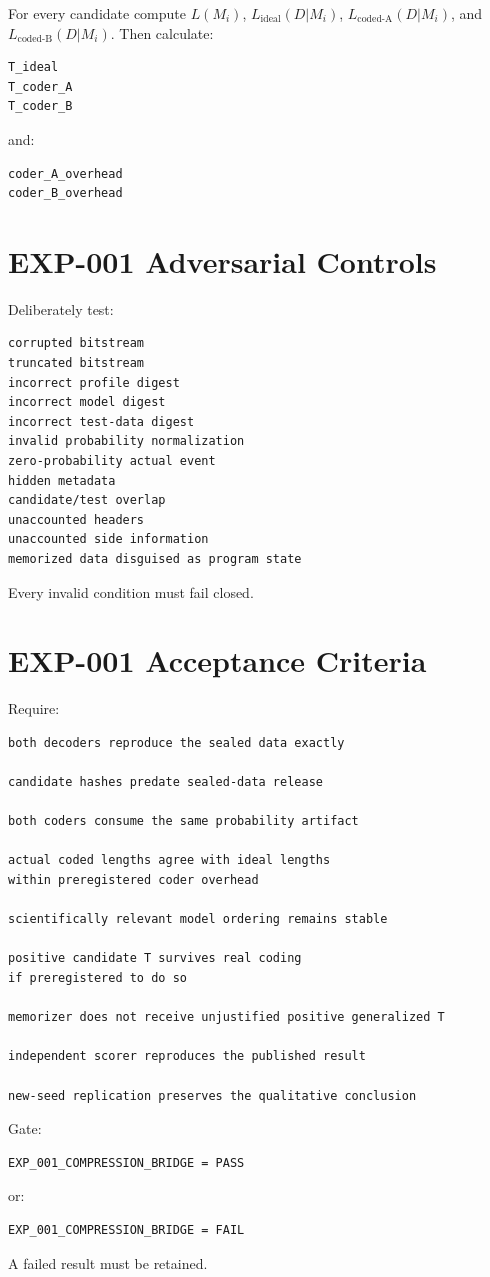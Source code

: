 \documentclass[11pt]{article}
\begin{document}
For every candidate compute \(L(M_i)\), \(L_{\text{ideal}}(D|M_i)\), \(L_{\text{coded-A}}(D|M_i)\), and \(L_{\text{coded-B}}(D|M_i)\). Then calculate:
\begin{verbatim}
T_ideal
T_coder_A
T_coder_B
\end{verbatim}
and:
\begin{verbatim}
coder_A_overhead
coder_B_overhead
\end{verbatim}

\section{EXP-001 Adversarial Controls}

Deliberately test:
\begin{verbatim}
corrupted bitstream
truncated bitstream
incorrect profile digest
incorrect model digest
incorrect test-data digest
invalid probability normalization
zero-probability actual event
hidden metadata
candidate/test overlap
unaccounted headers
unaccounted side information
memorized data disguised as program state
\end{verbatim}
Every invalid condition must fail closed.

\section{EXP-001 Acceptance Criteria}

Require:
\begin{verbatim}
both decoders reproduce the sealed data exactly

candidate hashes predate sealed-data release

both coders consume the same probability artifact

actual coded lengths agree with ideal lengths
within preregistered coder overhead

scientifically relevant model ordering remains stable

positive candidate T survives real coding
if preregistered to do so

memorizer does not receive unjustified positive generalized T

independent scorer reproduces the published result

new-seed replication preserves the qualitative conclusion
\end{verbatim}
Gate:
\begin{verbatim}
EXP_001_COMPRESSION_BRIDGE = PASS
\end{verbatim}
or:
\begin{verbatim}
EXP_001_COMPRESSION_BRIDGE = FAIL
\end{verbatim}
A failed result must be retained.
\end{document}
